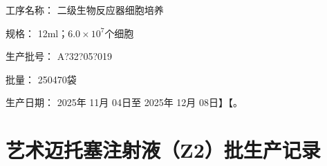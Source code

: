 \documentclass[UTF8,10pt,a4paper,fontset=fandol]{ctexart}
\newcommand{\fieldvalue}[1]{#1}
\newcommand{\handwritten}[1]{#1}
\begin{document}
\vspace{1em}

\noindent
工序名称：\hspace{1em}%
\fieldvalue{二级生物反应器细胞培养}
\hrulefill

\vspace{1em}

\noindent
规\quad 格：\hspace{1em}%
\fieldvalue{12ml；$6.0\times10^{7}$个细胞}
\hrulefill

\vspace{1em}

\noindent
生产批号：\hspace{1em}%
\fieldvalue{\handwritten{A?32?05?019}}
\hrulefill

\vspace{1em}

\noindent
批\quad 量：\hspace{1em}%
\fieldvalue{\handwritten{250470}}\quad 袋
\hrulefill

\vspace{1em}

\noindent
生产日期：\hspace{1em}%
\fieldvalue{\handwritten{2025}}年%
\fieldvalue{\handwritten{11}}月%
\fieldvalue{\handwritten{04}}日至%
\fieldvalue{\handwritten{2025}}年%
\fieldvalue{\handwritten{12}}月%
\fieldvalue{\handwritten{08}}日】【。

\newpage

\section*{艺术迈托塞注射液（Z2）批生产记录}
\end{document}
